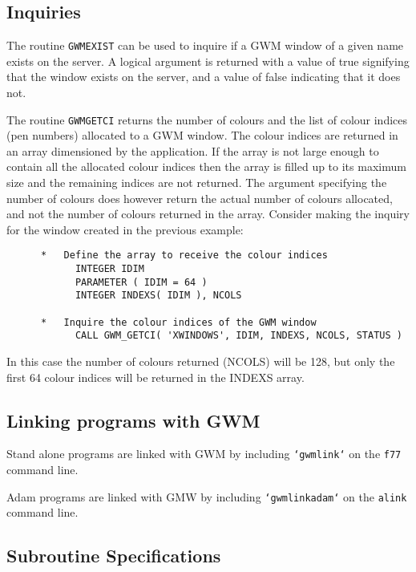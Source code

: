 \documentclass[twoside,11pt]{article}
\newcommand{\htmlref}[2]{#1}
\renewcommand{\_}{\texttt{\symbol{95}}}
\begin{document}
\subsection{Inquiries}
The routine \texttt{\htmlref{GWM\_EXIST}{GWM_EXIST}}
can be used to inquire if a GWM window of
a given name exists on the server. A logical argument is returned with
a value of true signifying that the window exists on the server, and
a value of false indicating that it does not.

The routine \texttt{\htmlref{GWM\_GETCI}{GWM_GETCI}}
returns the number of colours and the list
of colour indices (pen numbers) allocated to a GWM window. The colour
indices are returned in an array dimensioned by the application. If the
array is not large enough to contain all the allocated colour indices
then the array is filled up to its maximum size and the remaining indices
are not returned. The argument specifying the number of colours does
however return the actual number of colours allocated, and not the number
of colours returned in the array. Consider making the inquiry for
the window created in the previous example:

\begin{small}
\begin{verbatim}
      *   Define the array to receive the colour indices
            INTEGER IDIM
            PARAMETER ( IDIM = 64 )
            INTEGER INDEXS( IDIM ), NCOLS

      *   Inquire the colour indices of the GWM window
            CALL GWM_GETCI( 'XWINDOWS', IDIM, INDEXS, NCOLS, STATUS )
\end{verbatim}
\end{small}

In this case the number of colours returned (NCOLS) will be 128, but
only the first 64 colour indices will be returned in the INDEXS array.

\subsection{Linking programs with GWM}
Stand alone programs are linked with GWM by including
{\tt `gwm\_link`} on the {\tt f77} command line.

Adam programs are linked with GMW by including {\tt `gwm\_link\_adam`} on the
{\tt alink} command line.

\newpage
\subsection{Subroutine Specifications}
\end{document}
